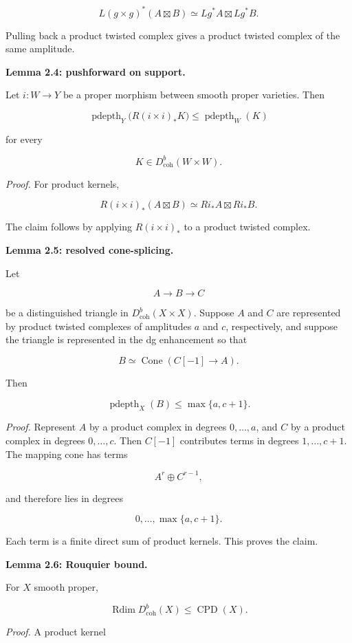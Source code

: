 \documentclass[11pt]{amsart}
\theoremstyle{definition}
\begin{document}
\[
L(g\times g)^*(A\boxtimes B)
\simeq
Lg^*A\boxtimes Lg^*B.
\]

Pulling back a product twisted complex gives a product twisted complex of the same amplitude.

\noindent\textbf{Lemma 2.4: pushforward on support.}

Let $i:W\to Y$ be a proper morphism between smooth proper varieties. Then

\[
\operatorname{pdepth}_Y\bigl(R(i\times i)_*K\bigr)
\le
\operatorname{pdepth}_W(K)
\]

for every

\[
K\in D^b_{\mathrm{coh}}(W\times W).
\]

\noindent\emph{Proof.} For product kernels,

\[
R(i\times i)_*(A\boxtimes B)
\simeq
Ri_*A\boxtimes Ri_*B.
\]

The claim follows by applying $R(i\times i)_*$ to a product twisted complex.

\noindent\textbf{Lemma 2.5: resolved cone-splicing.}

Let

\[
A\to B\to C
\]

be a distinguished triangle in $D^b_{\mathrm{coh}}(X\times X)$. Suppose $A$ and $C$ are represented by product twisted complexes of amplitudes $a$ and $c$, respectively, and suppose the triangle is represented in the dg enhancement so that

\[
B\simeq \operatorname{Cone}(C[-1]\to A).
\]

Then

\[
\operatorname{pdepth}_X(B)\le \max\{a,c+1\}.
\]

\noindent\emph{Proof.} Represent $A$ by a product complex in degrees $0,\dots,a$, and $C$ by a product complex in degrees $0,\dots,c$. Then $C[-1]$ contributes terms in degrees $1,\dots,c+1$. The mapping cone has terms

\[
A^r\oplus C^{r-1},
\]

and therefore lies in degrees

\[
0,\dots,\max\{a,c+1\}.
\]

Each term is a finite direct sum of product kernels. This proves the claim.

\noindent\textbf{Lemma 2.6: Rouquier bound.}

For $X$ smooth proper,

\[
\operatorname{Rdim}D^b_{\mathrm{coh}}(X)\le \operatorname{CPD}(X).
\]

\noindent\emph{Proof.} A product kernel
\end{document}
